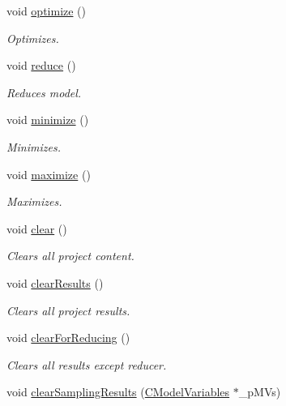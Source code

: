 \begin{DoxyCompactItemize}
void \hyperlink{class_go_s_u_m_1_1_c_container_a8c9a21e3e048da67a4d1e0950877ac3c}{optimize} ()
\begin{DoxyCompactList}\small\item\em Optimizes. \end{DoxyCompactList}\item 
void \hyperlink{class_go_s_u_m_1_1_c_container_aea6baeca7db258ebef1143e7fefb4e2a}{reduce} ()
\begin{DoxyCompactList}\small\item\em Reduces model. \end{DoxyCompactList}\item 
void \hyperlink{class_go_s_u_m_1_1_c_container_a42773631ab73d17ac47673d17d27ef5a}{minimize} ()
\begin{DoxyCompactList}\small\item\em Minimizes. \end{DoxyCompactList}\item 
void \hyperlink{class_go_s_u_m_1_1_c_container_accd74ef02f6e8dca6b0bc7418242cd8f}{maximize} ()
\begin{DoxyCompactList}\small\item\em Maximizes. \end{DoxyCompactList}\item 
void \hyperlink{class_go_s_u_m_1_1_c_container_a9e4d2236683349d7923ae0a1b5575e67}{clear} ()
\begin{DoxyCompactList}\small\item\em Clears all project content. \end{DoxyCompactList}\item 
void \hyperlink{class_go_s_u_m_1_1_c_container_a930dff672b2635bb8fcb56a3f2c9b3cd}{clear\-Results} ()
\begin{DoxyCompactList}\small\item\em Clears all project results. \end{DoxyCompactList}\item 
void \hyperlink{class_go_s_u_m_1_1_c_container_a834bc751235dd105bfc3622a40adab9c}{clear\-For\-Reducing} ()
\begin{DoxyCompactList}\small\item\em Clears all results except reducer. \end{DoxyCompactList}\item 
void \hyperlink{class_go_s_u_m_1_1_c_container_a743cc91c2a279bac44cd5ecda5d47b5e}{clear\-Sampling\-Results} (\hyperlink{class_go_s_u_m_1_1_c_model_variables}{C\-Model\-Variables} $\ast$\-\_\-p\-M\-Vs)

\end{DoxyCompactItemize}
